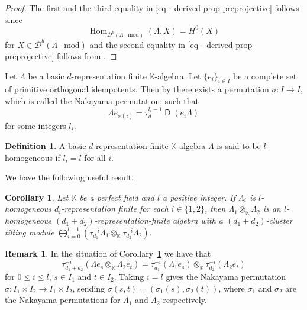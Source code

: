 \documentclass[a4paper, reqno]{amsart}
\newtheorem{mycor}[mythm]{Corollary}
\theoremstyle{definition}
\newtheorem{mydef}[mythm]{Definition}
\newtheorem{myrem}[mythm]{Remark}
\newcommand{\K}{\mathbb{K}}
\DeclareMathOperator{\Hom}{\mathrm{Hom}}
\DeclareMathOperator{\DD}{\mathsf{D}}
\begin{document}
\begin{proof}
	The first and the third equality in \eqref{eq - derived prop preprojective} follows since
	\begin{equation*}
		\Hom_{\mathcal{D}^b(\Lambda\mathrm{-mod})}(\Lambda, X) = H^0(X)
	\end{equation*}
	for $X\in \mathcal{D}^b(\Lambda\mathrm{-mod})$ and the second equality in \eqref{eq - derived prop preprojective} follows from \cite[Lemma 5.5 (b)]{Iyama2011clustertiltinghigheraus}.
\end{proof}

Let $\Lambda$ be a basic $d$-representation finite $\K$-algebra. Let $\{e_i\}_{i\in I}$ be a complete set of primitive orthogonal idempotents. Then by \cite[Proposition 1.3 (b)]{Iyama2011clustertiltinghigheraus} there exists a permutation $\sigma:I\to I$, which is called the Nakayama permutation, such that
\begin{equation*}
	\Lambda e_{\sigma(i)} = \tau_d^{l_i - 1}\DD(e_i\Lambda)
\end{equation*}
for some integers $l_i$.

\begin{mydef}\cite[Definition 1.2]{herschend2011n}
	A basic $d$-representation finite $\K$-algebra $\Lambda$ is said to be $l$-homogeneous if $l_i = l$ for all $i$.
\end{mydef}

We have the following useful result.

\begin{mycor}\cite[Corollary 1.5]{herschend2011n}\label{corollary - A x B is n_1 + n_2 RF}
	Let $\mathbb{K}$ be a perfect field and $l$ a positive integer. If $\Lambda_i$ is $l$-homogeneous $d_i$-representation finite for each $i\in \{1, 2\}$, then $\Lambda_1\otimes_\K \Lambda_2$ is an $l$-homogeneous $(d_1 + d_2)$-representation-finite algebra with a $(d_1 + d_2)$-cluster tilting module $\bigoplus_{i=0}^{l-1}(\tau_{d_1}^{-i}\Lambda_1\otimes_\K \tau_{d_2}^{-i}\Lambda_2)$.
\end{mycor}

\begin{myrem}\label{remark - nakayama permutation tensor product}
	In the situation of Corollary~\ref{corollary - A x B is n_1 + n_2 RF} we have that
	\begin{equation*}
		\tau_{d_1 + d_2}^{-i}(\Lambda e_s \otimes_\K \Lambda_2 e_t) = \tau_{d_1}^{-i}(\Lambda_1 e_s)\otimes_\K \tau_{d_2}^{-i}(\Lambda_2 e_t)
	\end{equation*}
	for $0\le i\le l$, $s\in I_1$ and $t\in I_2$. Taking $i=l$ gives the Nakayama permutation $\sigma: I_1\times I_2\to I_1\times I_2$, sending $\sigma(s, t) = (\sigma_1(s), \sigma_2(t))$, where $\sigma_1$ and $\sigma_2$ are the Nakayama permutations for $\Lambda_1$ and $\Lambda_2$ respectively.
\end{myrem}
\end{document}
